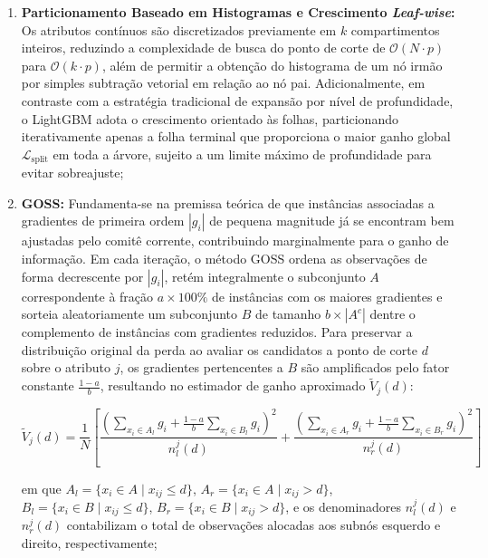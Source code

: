 \begin{enumerate}
    \item \textbf{Particionamento Baseado em Histogramas e Crescimento \textit{Leaf-wise}:} Os atributos contínuos são discretizados previamente em $k$ compartimentos inteiros, reduzindo a complexidade de busca do ponto de corte de $\mathcal{O}(N \cdot p)$ para $\mathcal{O}(k \cdot p)$, além de permitir a obtenção do histograma de um nó irmão por simples subtração vetorial em relação ao nó pai. Adicionalmente, em contraste com a estratégia tradicional de expansão por nível de profundidade, o LightGBM adota o crescimento orientado às folhas, particionando iterativamente apenas a folha terminal que proporciona o maior ganho global $\mathcal{L}_{\text{split}}$ em toda a árvore, sujeito a um limite máximo de profundidade para evitar sobreajuste;

    \item \textbf{\gls{GOSS}:} Fundamenta-se na premissa teórica de que instâncias associadas a gradientes de primeira ordem $|g_i|$ de pequena magnitude já se encontram bem ajustadas pelo comitê corrente, contribuindo marginalmente para o ganho de informação. Em cada iteração, o método \gls{GOSS} ordena as observações de forma decrescente por $|g_i|$, retém integralmente o subconjunto $A$ correspondente à fração $a \times 100\%$ de instâncias com os maiores gradientes e sorteia aleatoriamente um subconjunto $B$ de tamanho $b \times |A^c|$ dentre o complemento de instâncias com gradientes reduzidos. Para preservar a distribuição original da perda ao avaliar os candidatos a ponto de corte $d$ sobre o atributo $j$, os gradientes pertencentes a $B$ são amplificados pelo fator constante $\frac{1-a}{b}$, resultando no estimador de ganho aproximado $\tilde{V}_j(d)$:
    
    \begin{equation}
        \tilde{V}_j(d) = \frac{1}{N} \left[ \frac{\left(\sum_{x_i \in A_l} g_i + \frac{1-a}{b}\sum_{x_i \in B_l} g_i\right)^2}{n_l^j(d)} + \frac{\left(\sum_{x_i \in A_r} g_i + \frac{1-a}{b}\sum_{x_i \in B_r} g_i\right)^2}{n_r^j(d)} \right] \label{eq:goss_lightgbm}
    \end{equation}
    
    \noindent em que $A_l = \{x_i \in A \mid x_{ij} \le d\}$, $A_r = \{x_i \in A \mid x_{ij} > d\}$, $B_l = \{x_i \in B \mid x_{ij} \le d\}$, $B_r = \{x_i \in B \mid x_{ij} > d\}$, e os denominadores $n_l^j(d)$ e $n_r^j(d)$ contabilizam o total de observações alocadas aos subnós esquerdo e direito, respectivamente;


\end{enumerate}
